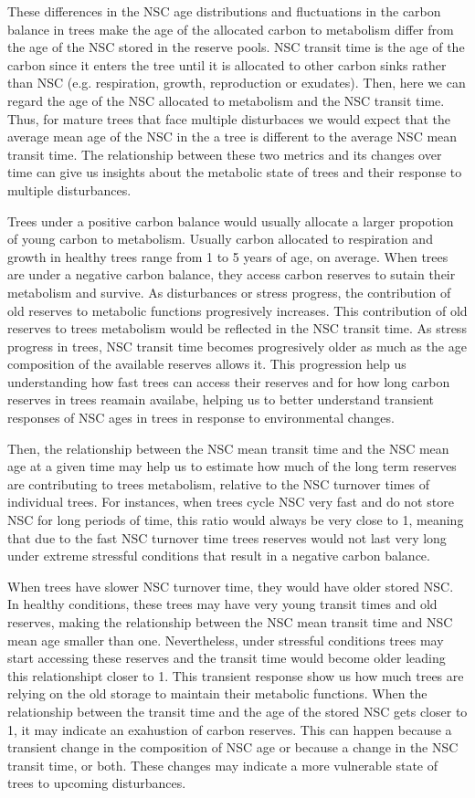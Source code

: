 \documentclass{article}
\begin{document}
These differences in the NSC age distributions and fluctuations in the carbon balance in trees make the age of the allocated carbon to metabolism differ from the age of the NSC stored in the reserve pools.
NSC transit time is the age of the carbon since it enters the tree until it is allocated to other carbon sinks rather than NSC (e.g. respiration, growth, reproduction or exudates).  
Then, here we can regard the age of the NSC allocated to metabolism and the NSC transit time. 
Thus, for mature trees that face multiple disturbaces we would expect that the average mean age of the NSC in the a tree is different to the average NSC mean transit time. 
The relationship between these two metrics and its changes over time can give us insights about the metabolic state of trees and their response to multiple disturbances. 

Trees under a positive carbon balance would usually allocate a larger propotion of young carbon to metabolism.
Usually carbon allocated to respiration and growth in healthy trees range from 1 to 5 years of age, on average.
When trees are under a negative carbon balance, they access carbon reserves to sutain their metabolism and survive. 
As disturbances or stress progress,  the contribution of old reserves to metabolic functions progresively increases. 
This contribution of old reserves to trees metabolism would be reflected in the NSC transit time.
As stress progress in trees, NSC transit time becomes progresively older as much as the age composition of the available reserves allows it.
This progression help us understanding how fast trees can access their reserves and for how long carbon reserves in trees reamain availabe, helping us to better understand transient responses of NSC ages in trees in response to environmental changes.  

Then, the relationship between the NSC mean transit time and the NSC mean age at a given time may help us to estimate how much of the long term reserves are contributing to trees metabolism, relative to the NSC turnover times of individual trees. 
For instances, when trees cycle NSC very fast and do not store NSC for long periods of time, this ratio would always be very close to 1, meaning that due to the fast NSC turnover time trees reserves would not last very long under extreme stressful conditions that result in a negative carbon balance. 

When trees have slower NSC turnover time, they would have older stored NSC. 
In healthy conditions, these trees may have very young transit times and old reserves, making the relationship between the NSC mean transit time and NSC mean age smaller than one. 
Nevertheless, under stressful conditions trees may start accessing these reserves and the transit time would become older leading this relationshipt closer to 1. 
This transient response show us how much trees are relying on the old storage to maintain their metabolic functions. 
When the relationship between the transit time and the age of the stored NSC gets closer to 1, it may indicate an exahustion of carbon reserves.
This can happen because a transient change in the composition of NSC age or because a change in the NSC transit time, or both.
These changes may indicate a more vulnerable state of trees to upcoming disturbances. 
\end{document}
